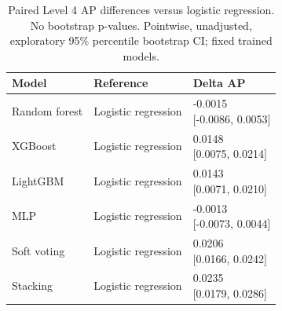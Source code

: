 \begin{table}[htbp]
\centering
\small
\caption{Paired Level 4 AP differences versus logistic regression. No bootstrap p-values. Pointwise, unadjusted, exploratory 95\% percentile bootstrap CI; fixed trained models.}
\label{tab:ap-vs-lr-level4}
\begin{tabular}{lll}
\toprule
Model & Reference & Delta AP \\
\midrule
Random forest & Logistic regression & \shortstack{{-0.0015} \\ {[-0.0086, 0.0053]}} \\
XGBoost & Logistic regression & \shortstack{{0.0148} \\ {[0.0075, 0.0214]}} \\
LightGBM & Logistic regression & \shortstack{{0.0143} \\ {[0.0071, 0.0210]}} \\
MLP & Logistic regression & \shortstack{{-0.0013} \\ {[-0.0073, 0.0044]}} \\
Soft voting & Logistic regression & \shortstack{{0.0206} \\ {[0.0166, 0.0242]}} \\
Stacking & Logistic regression & \shortstack{{0.0235} \\ {[0.0179, 0.0286]}} \\
\bottomrule
\end{tabular}
\end{table}

